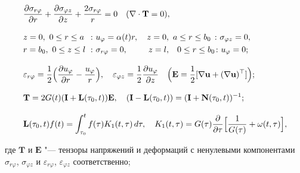 \begin{align}\label{Manzh_eq_1}

  &%

  \frac{\partial\sigma_{r\varphi}}{\partial r}+\frac{\partial\sigma_{\varphi z}}{\partial z}+\frac{2\sigma_{r\varphi}}r=0\quad   (\nabla\cdot\mathbf T= 0),

\\[3mm]

  &\nonumber

  z=0,\ 0\leq r\leq a \ \ \colon  u_\varphi=\alpha(t)r,

\quad 

  z=0,\ a\leq r\leq b_0 \ \colon  \sigma_{\varphi z}=0,

\\

  &\nonumber

  r=b_0,\ 0\leq z\leq l \ \ \! \colon  \sigma_{r\varphi}=0,

\quad  \quad \ \ \!

  z=l,\ \! \ \ 0\leq r\leq b_0\colon u_\varphi=0;

\\[3mm]

  &\nonumber

  \varepsilon_{r\varphi}=\frac12\Bigl(\frac{\partial u_\varphi}{\partial r}-\frac{u_\varphi}r\Bigr),

\quad   \varepsilon_{\varphi z}=\frac12\frac{\partial u_\varphi}{\partial z}\quad

  \Bigl( \mathbf E =\frac12[\nabla\mathbf u+(\nabla\mathbf u)^\top]\Bigr);

\\[3mm]

  &\nonumber

  \mathbf T=2G(t)(\mathbf I+\mathbf L(\tau_0,t))\mathbf E,

\quad 

  (\mathbf I-\mathbf L(\tau_0,t))=(\mathbf I+\mathbf N(\tau_0,t))^{-1};

\\[3mm]

  &\nonumber

   \mathbf L(\tau_0,t)f(t)=\int_{\tau_0}^tf(\tau)K_1(t,\tau)\,d\tau,

\quad 

  K_1(t,\tau)=G(\tau)\frac{\partial}{\partial\tau}\Bigl[\frac1{G(\tau)}+\omega(t,\tau)\Bigr],

\end{align}

где $\mathbf T$ и $\mathbf E$ "--- тензоры напряжений и деформаций  с ненулевыми компонентами $\sigma_{r\varphi}$, $\sigma_{\varphi z}$ и $\varepsilon_{r\varphi}$, $\varepsilon_{\varphi z}$ соответственно; 

